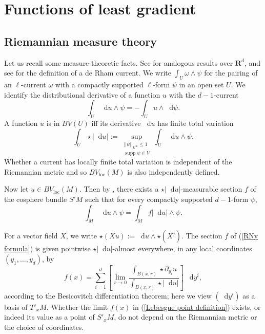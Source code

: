 \documentclass[reqno,12pt,letterpaper]{amsart}
\newcommand{\RR}{\mathbf{R}}
\DeclareMathOperator{\supp}{supp}
\newcommand*\dif{\mathop{}\!\mathrm{d}}
\newcommand{\loc}{\mathrm{loc}}
\theoremstyle{definition}
\numberwithin{equation}{section}
\begin{document}
\section{Functions of least gradient}\label{LeastGradientFunctions}
\subsection{Riemannian measure theory}
Let us recall some measure-theoretic facts.
See \cite[Chapter 1]{Giusti77} for analogous results over $\RR^d$, and see \cite{simon1983GMT} for the definition of a de Rham current.
We write $\int_U \omega \wedge \psi$ for the pairing of an $\ell$-current $\omega$ with a compactly supported $\ell$-form $\psi$ in an open set $U$.
We identify the distributional derivative of a function $u$ with the $d-1$-current
$$\int_U \dif u \wedge \psi = -\int_U u \wedge \dif \psi.$$
A function $u$ is in $BV(U)$ iff its derivative $\dif u$ has finite total variation
\begin{equation}\label{total variation}
\int_U \star |\dif u| := \sup_{\substack{||\psi||_{L^\infty} \leq 1\\\supp \psi \Subset V}} \int_U \dif u \wedge \psi.
\end{equation}
Whether a current has locally finite total variation is independent of the Riemannian metric and so $BV_\loc(M)$ is also independently defined.

Now let $u \in BV_\loc(M)$.
Then by \cite[Theorem 4.14]{simon1983GMT}, there exists a $\star |\dif u|$-measurable section $f$ of the cosphere bundle $S'M$ such that for every compactly supported $d-1$-form $\psi$,
\begin{equation}\label{RNy formula}
\int_M \dif u \wedge \psi = \int_M f|\dif u| \wedge \psi.
\end{equation}

For a vector field $X$, we write $\star (Xu) := \dif u \wedge \star (X^\flat)$.
The section $f$ of (\ref{RNy formula}) is given pointwise $\star |\dif u|$-almost everywhere, in any local coordinates $(y_1, \dots, y_d)$, by
\begin{equation}\label{Lebesgue point definition}
    f(x) = \sum_{i = 1}^d \left[\lim_{r \to 0} \frac{\int_{B(x, r)} \star \partial_{y_i} u}{\int_{B(x, r)} \star |\dif u|}\right] ~\dif y^i,
\end{equation}
according to the Besicovitch differentiation theorem; here we view $(\dif y^i)$ as a basis of $T'_xM$.
Whether the limit $f(x)$ in (\ref{Lebesgue point definition}) exists, or indeed its value as a point of $S'_xM$, do not depend on the Riemannian metric or the choice of coordinates.
\end{document}
